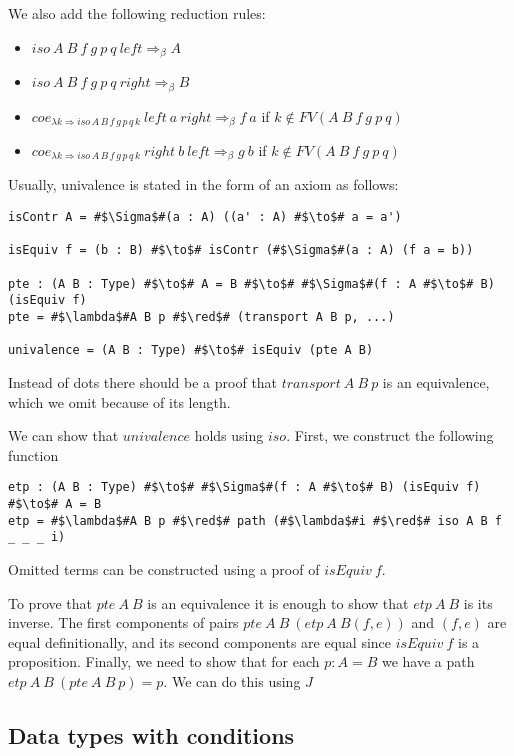 \documentclass{amsart}
\theoremstyle{definition}
\theoremstyle{remark}
\newcommand{\red}{\Rightarrow}
\numberwithin{figure}{section}
\begin{document}
We also add the following reduction rules:
\begin{itemize}
\item $iso\ A\ B\ f\ g\ p\ q\ left \red_\beta A$
\item $iso\ A\ B\ f\ g\ p\ q\ right \red_\beta B$
\item $coe_{\lambda k \red iso\,A\,B\,f\,g\,p\,q\,k}\ left\ a\ right \red_\beta f\ a$ if $k \notin FV(A\ B\ f\ g\ p\ q)$
\item $coe_{\lambda k \red iso\,A\,B\,f\,g\,p\,q\,k}\ right\ b\ left \red_\beta g\ b$ if $k \notin FV(A\ B\ f\ g\ p\ q)$
\end{itemize}

Usually, univalence is stated in the form of an axiom as follows:
\begin{lstlisting}
isContr A = #$\Sigma$#(a : A) ((a' : A) #$\to$# a = a')

isEquiv f = (b : B) #$\to$# isContr (#$\Sigma$#(a : A) (f a = b))

pte : (A B : Type) #$\to$# A = B #$\to$# #$\Sigma$#(f : A #$\to$# B) (isEquiv f)
pte = #$\lambda$#A B p #$\red$# (transport A B p, ...)

univalence = (A B : Type) #$\to$# isEquiv (pte A B)
\end{lstlisting}
Instead of dots there should be a proof that $transport\ A\ B\ p$ is an equivalence, which we omit because of its length.

We can show that $univalence$ holds using $iso$.
First, we construct the following function
\begin{lstlisting}
etp : (A B : Type) #$\to$# #$\Sigma$#(f : A #$\to$# B) (isEquiv f) #$\to$# A = B
etp = #$\lambda$#A B p #$\red$# path (#$\lambda$#i #$\red$# iso A B f _ _ _ i)
\end{lstlisting}
Omitted terms can be constructed using a proof of $isEquiv\ f$.

To prove that $pte\ A\ B$ is an equivalence it is enough to show that $etp\ A\ B$ is its inverse.
The first components of pairs $pte\ A\ B\ (etp\ A\ B (f, e))$ and $(f, e)$ are equal definitionally, and its second components are equal since $isEquiv\ f$ is a proposition.
Finally, we need to show that for each $p : A = B$ we have a path $etp\ A\ B\ (pte\ A\ B\ p) = p$.
We can do this using $J$

\subsection{Data types with conditions}
\end{document}
